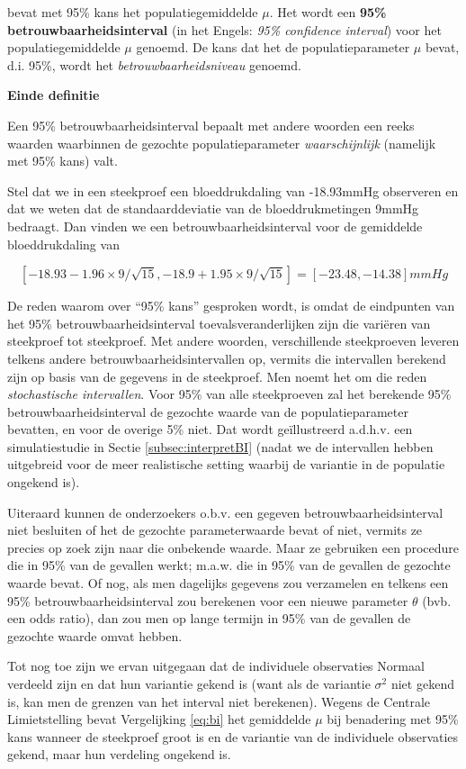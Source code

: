\documentclass[
  12pt,dutch,coursenotes]{book}
\theoremstyle{definition}
\theoremstyle{definition}
\theoremstyle{definition}
\theoremstyle{definition}
\theoremstyle{remark}
\begin{document}
bevat met 95\% kans het populatiegemiddelde \(\mu\). Het wordt een \textbf{95\% betrouwbaarheidsinterval} (in het Engels: \emph{95\% confidence interval}) voor het populatiegemiddelde \(\mu\) genoemd. De kans dat het de populatieparameter \(\mu\)
bevat, d.i. 95\%, wordt het \emph{betrouwbaarheidsniveau} genoemd.

\textbf{Einde definitie}

Een 95\% betrouwbaarheidsinterval bepaalt met andere woorden een reeks
waarden waarbinnen de gezochte populatieparameter \emph{waarschijnlijk}
(namelijk met 95\% kans) valt.

Stel dat we in een steekproef een bloeddrukdaling van -18.93mmHg observeren en dat we weten dat de standaarddeviatie van de bloeddrukmetingen 9mmHg bedraagt. Dan vinden we een betrouwbaarheidsinterval voor de gemiddelde bloeddrukdaling van

\[\left[-18.93-1.96\times 9/\sqrt{15},-18.9+1.95\times 9/\sqrt{15}\right]=[-23.48,-14.38]mmHg\]

De reden waarom over ``95\% kans'' gesproken wordt, is omdat de eindpunten van
het 95\% betrouwbaarheidsinterval toevalsveranderlijken zijn die variëren
van steekproef tot steekproef. Met andere woorden, verschillende
steekproeven leveren telkens andere betrouwbaarheidsintervallen op, vermits
die intervallen berekend zijn op basis van de gegevens in de steekproef. Men
noemt het om die reden \emph{stochastische intervallen}.
Voor 95\% van alle steekproeven zal het berekende 95\% betrouwbaarheidsinterval de
gezochte waarde van de populatieparameter bevatten, en voor de overige 5\%
niet. Dat wordt geïllustreerd a.d.h.v. een simulatiestudie in Sectie \ref{subsec:interpretBI} (nadat we de intervallen hebben uitgebreid voor de meer realistische setting waarbij de variantie in de populatie ongekend is).

Uiteraard kunnen de onderzoekers o.b.v. een gegeven betrouwbaarheidsinterval
niet besluiten of het de gezochte parameterwaarde bevat of niet, vermits ze
precies op zoek zijn naar die onbekende waarde. Maar ze gebruiken een
procedure die in 95\% van de gevallen werkt; m.a.w. die in 95\% van de
gevallen de gezochte waarde bevat. Of nog, als men dagelijks gegevens zou
verzamelen en telkens een 95\% betrouwbaarheidsinterval zou berekenen voor
een nieuwe parameter \(\theta\) (bvb. een odds ratio), dan zou men op lange termijn in 95\% van de gevallen de gezochte waarde omvat hebben.

Tot nog toe zijn we ervan uitgegaan dat de individuele observaties Normaal verdeeld zijn en dat hun variantie gekend is (want als de variantie \(\sigma^2\) niet gekend is, kan men de grenzen van het interval niet berekenen).
Wegens de Centrale Limietstelling bevat Vergelijking \eqref{eq:bi} het gemiddelde \(\mu\)
bij benadering met 95\% kans wanneer de steekproef groot is en de variantie
van de individuele observaties gekend, maar hun verdeling ongekend is.
\end{document}
